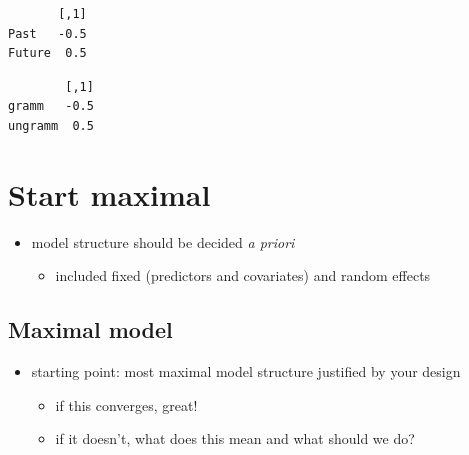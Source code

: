 \documentclass[
  letterpaper,
  DIV=11,
  numbers=noendperiod]{scrartcl}
\newenvironment{Shaded}{\begin{snugshade}}{\end{snugshade}}
\newcommand{\FunctionTok}[1]{\textcolor[rgb]{0.28,0.35,0.67}{#1}}
\newcommand{\NormalTok}[1]{\textcolor[rgb]{0.00,0.23,0.31}{#1}}
\newcommand{\SpecialCharTok}[1]{\textcolor[rgb]{0.37,0.37,0.37}{#1}}
\providecommand{\tightlist}{%
  \setlength{\itemsep}{0pt}\setlength{\parskip}{0pt}}\usepackage{longtable,booktabs,array}
\begin{document}
\begin{Shaded}
\end{Shaded}

\begin{verbatim}
       [,1]
Past   -0.5
Future  0.5
\end{verbatim}

\begin{Shaded}
\end{Shaded}

\begin{verbatim}
        [,1]
gramm   -0.5
ungramm  0.5
\end{verbatim}

\hypertarget{start-maximal}{%
\section{Start maximal}\label{start-maximal}}

\begin{itemize}
\tightlist
\item
  model structure should be decided \emph{a priori}

  \begin{itemize}
  \tightlist
  \item
    included fixed (predictors and covariates) and random effects
  \end{itemize}
\end{itemize}

\hypertarget{maximal-model}{%
\subsection{Maximal model}\label{maximal-model}}

\begin{itemize}
\tightlist
\item
  starting point: most maximal model structure justified by your design

  \begin{itemize}
  \tightlist
  \item
    if this converges, great!
  \item
    if it doesn't, what does this mean and what should we do?
  \end{itemize}
\end{itemize}
\end{document}
